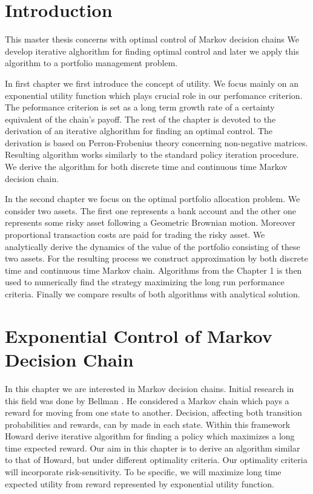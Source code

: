 {}
\chapter*{Introduction}
This master thesis concerns with optimal control of Markov decision chains%
We develop iterative alghorithm for finding optimal control and later we apply this algorithm to a portfolio management problem.

In first chapter we first introduce the concept of utility. We focus mainly on an exponential utility function which plays crucial role in our perfomance criterion. The peformance criterion is set as a long term growth rate of a certainty equivalent of the chain's payoff. The rest of the chapter is devoted to the derivation of an iterative alghorithm for finding an optimal control. The derivation is based on Perron-Frobenius theory concerning non-negative matrices. Resulting algorithm works similarly to the standard policy iteration procedure. We derive the algorithm for both discrete time and continuous time Markov decision chain.

In the second chapter we focus on the optimal portfolio allocation problem. We consider two assets. The first one represents a bank account and the other one represents some risky asset following a Geometric Brownian motion. Moreover proportional transaction costs are paid for trading the risky asset. We analytically derive the dynamics of the value of the portfolio consisting of these two assets. For the resulting process we construct approximation by both discrete time and continuous time Markov chain. Algorithms from the Chapter 1 is then used to numerically find  the strategy maximizing the long run performance criteria. Finally we compare results of both algorithms with analytical solution. %

\chapter{Exponential Control of Markov Decision Chain}

In this chapter we are interested in Markov decision chains. Initial research in this field was done by Bellman \cite{Bellman}. He considered a Markov chain which pays a reward for moving from one state to another. Decision, affecting both transition probabilities and rewards, can by made in each state. Within this framework Howard \cite{Howard} derive iterative algorithm for finding a policy which maximizes a long time expected reward. Our aim in this chapter is to derive an algorithm similar to that of Howard, but under different optimality criteria. Our optimality criteria will incorporate risk-sensitivity. To be specific, we will maximize long time expected utility from reward represented by exponential utility function.

